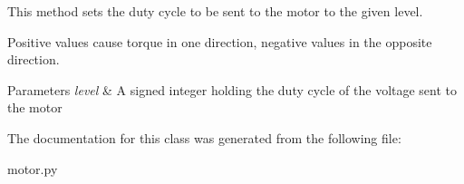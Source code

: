 This method sets the duty cycle to be sent to the motor to the given level. 

Positive values cause torque in one direction, negative values in the opposite direction. 
\begin{DoxyParams}{Parameters}
{\em level} & A signed integer holding the duty cycle of the voltage sent to the motor \\
\hline
\end{DoxyParams}


The documentation for this class was generated from the following file\+:\begin{DoxyCompactItemize}
\item 
motor.\+py\end{DoxyCompactItemize}
